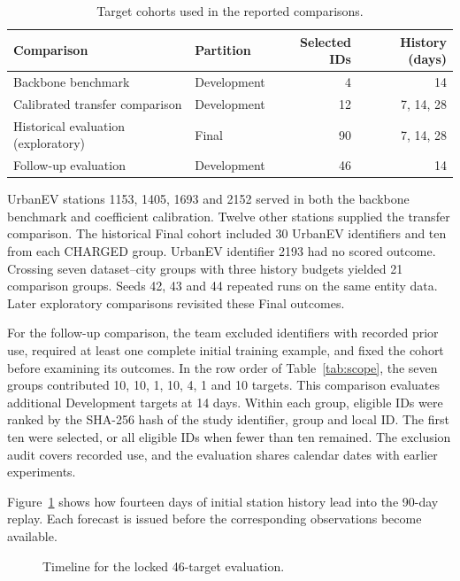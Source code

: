 \begin{table}[htbp]\centering\small
\caption{Target cohorts used in the reported comparisons.}\label{tab:target-cohorts}
\begin{tabular}{llrr}\toprule
Comparison & Partition & Selected IDs & History (days)\\\midrule
Backbone benchmark & Development & 4 & 14\\
Calibrated transfer comparison & Development & 12 & 7, 14, 28\\
Historical evaluation (exploratory) & Final & 90 & 7, 14, 28\\
Follow-up evaluation & Development & 46 & 14\\\bottomrule
\end{tabular}\end{table}

UrbanEV stations 1153, 1405, 1693 and 2152 served in both the backbone benchmark and coefficient calibration. Twelve other stations supplied the transfer comparison. The historical Final cohort included 30 UrbanEV identifiers and ten from each CHARGED group. UrbanEV identifier 2193 had no scored outcome. Crossing seven dataset--city groups with three history budgets yielded 21 comparison groups. Seeds 42, 43 and 44 repeated runs on the same entity data. Later exploratory comparisons revisited these Final outcomes.

For the follow-up comparison, the team excluded identifiers with recorded prior use, required at least one complete initial training example, and fixed the cohort before examining its outcomes. In the row order of Table~\ref{tab:scope}, the seven groups contributed 10, 10, 1, 10, 4, 1 and 10 targets. This comparison evaluates additional Development targets at 14 days. Within each group, eligible IDs were ranked by the SHA-256 hash of the study identifier, group and local ID. The first ten were selected, or all eligible IDs when fewer than ten remained. The exclusion audit covers recorded use, and the evaluation shares calendar dates with earlier experiments.

Figure~\ref{fig:locked-timeline} shows how fourteen days of initial station history lead into the 90-day replay. Each forecast is issued before the corresponding observations become available.

\begin{figure}[H]\centering
{}
\caption{Timeline for the locked 46-target evaluation.}\label{fig:locked-timeline}
\end{figure}

